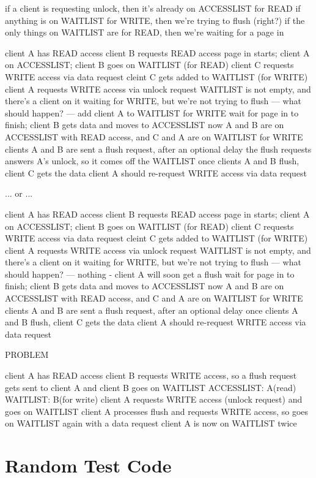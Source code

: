 \documentclass{article}
\begin{document}
if a client is requesting unlock, then it's already on ACCESSLIST for READ
if anything is on WAITLIST for WRITE, then we're trying to flush  (right?)
if the only things on WAITLIST are for READ, then we're waiting for a page in

client A has READ access
client B requests READ access
page in starts; client A on ACCESSLIST; client B goes on WAITLIST (for READ)
client C requests WRITE access via data request
cleint C gets added to WAITLIST (for WRITE)
client A requests WRITE access via unlock request
WAITLIST is not empty, and there's a client on it waiting for WRITE, but we're not trying to flush
--- what should happen? ---
add client A to WAITLIST for WRITE
wait for page in to finish; client B gets data and moves to ACCESSLIST
now A and B are on ACCESSLIST with READ access, and C and A are on WAITLIST for WRITE
clients A and B are sent a flush request, after an optional delay
the flush requests answers A's unlock, so it comes off the WAITLIST
once clients A and B flush, client C gets the data
client A should re-request WRITE access via data request

... or ...

client A has READ access
client B requests READ access
page in starts; client A on ACCESSLIST; client B goes on WAITLIST (for READ)
client C requests WRITE access via data request
cleint C gets added to WAITLIST (for WRITE)
client A requests WRITE access via unlock request
WAITLIST is not empty, and there's a client on it waiting for WRITE, but we're not trying to flush
--- what should happen? ---
nothing - client A will soon get a flush
wait for page in to finish; client B gets data and moves to ACCESSLIST
now A and B are on ACCESSLIST with READ access, and C and A are on WAITLIST for WRITE
clients A and B are sent a flush request, after an optional delay
once clients A and B flush, client C gets the data
client A should re-request WRITE access via data request


PROBLEM

client A has READ access
client B requests WRITE access, so a flush request gets sent to client A and client B goes on WAITLIST
   ACCESSLIST: A(read)   WAITLIST: B(for write)
client A requests WRITE access (unlock request) and goes on WAITLIST
client A processes flush and requests WRITE access, so goes on WAITLIST again with a data request
client A is now on WAITLIST twice


\section{Random Test Code}
\end{document}

